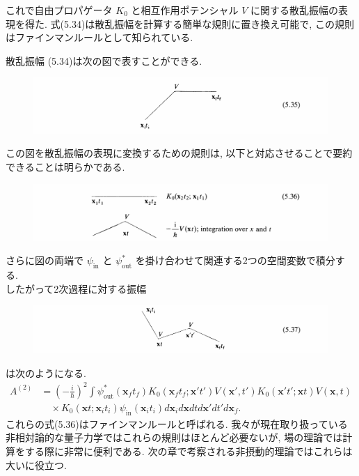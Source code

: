 \documentclass{jsarticle}
\begin{document}
これで自由プロパゲータ $K_0$ と相互作用ポテンシャル $V$ に関する散乱振幅の表現を得た. 式(5.34)は散乱振幅を計算する簡単な規則に置き換え可能で, この規則はファインマンルールとして知られている.\par
散乱振幅 (5.34)は次の図で表すことができる.
\begin{figure}[H]
    \centering\includegraphics[width=\textwidth]{figure/eq5-35.png}
\end{figure}
この図を散乱振幅の表現に変換するための規則は, 以下と対応させることで要約できることは明らかである.
\begin{figure}[H]
    \centering\includegraphics[width=\textwidth]{figure/eq5-36.png}
\end{figure}
さらに図の両端で $\psi_{\textrm{in}}$ と $\psi_{\textrm{out}}^{*}$ を掛け合わせて関連する2つの空間変数で積分する.\\
したがって2次過程に対する振幅
\begin{figure}[H]
    \centering\includegraphics[width=\textwidth]{figure/eq5-37.png}
\end{figure}
は次のようになる.
\begin{align*}
    A^{(2)} &= \left( -\frac{i}{\hbar} \right)^2 \int \psi_{\textrm{out}}^{*}(\mathbf{x}_f t_f) K_0(\mathbf{x}_f t_f; \mathbf{x}'t') V(\mathbf{x}',t')K_0(\mathbf{x}'t'; \mathbf{x}t) V(\mathbf{x},t)\\
    & \quad \times  K_0(\mathbf{x}t; \mathbf{x}_i t_i) \psi_{\textrm{in}}(\mathbf{x}_i t_i) d\mathbf{x}_i d\mathbf{x} dt d\mathbf{x}' dt' d\mathbf{x}_f.
    \end{align*}
    これらの式(5.36)はファインマンルールと呼ばれる. 我々が現在取り扱っている非相対論的な量子力学ではこれらの規則はほとんど必要ないが, 場の理論では計算をする際に非常に便利である. 次の章で考察される非摂動的理論ではこれらは大いに役立つ.\par
\end{document}
